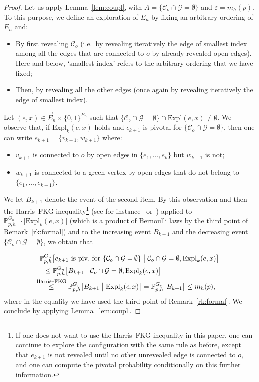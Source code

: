 \documentclass[10pt]{amsart}
\theoremstyle{definition}
\renewcommand{\pagebreak}[1][4]{}
\newcommand{\Pro}{\mathbb{P}}
\newcommand{\calC}{\mathcal{C}}
\newcommand{\calG}{\mathcal{G}}
\newcommand{\Expl}{\mathrm{Expl}}
\begin{document}
\begin{proof}
Let us apply Lemma~\ref{lem:coupl}, with $A=\{\calC_o\cap\calG=\emptyset\}$ and $\varepsilon=m_h(p)$. To this purpose, we define an exploration of $E_n$ by fixing an arbitrary ordering of $E_n$ and:
\begin{itemize}
\item By first revealing $\calC_o$ (i.e.\ by revealing iteratively the edge of smallest index among all the edges that are connected to $o$ by already revealed open edges). Here and below, `smallest index' refers to the arbitrary ordering that we have fixed;
\item Then, by revealing all the other edges (once again by revealing iteratively the edge of smallest index).
\end{itemize}
Let $(e,x) \in \vec{E}_n\times\{0,1\}^{E_n}$ such that $\{\calC_o\cap\calG=\emptyset\}\cap\Expl(e,x)\neq\emptyset$. We observe that, if $\Expl_k(e,x)$ holds and $e_{k+1}$ is pivotal for $\{\calC_o \cap \calG = \emptyset\}$, then one can write $e_{k+1}=\{v_{k+1},w_{k+1}\}$ where:
\begin{itemize}
\item $v_{k+1}$ is connected to $o$ by open edges in $\{e_1,\dots,e_k\}$ but $w_{k+1}$ is not;
\item $w_{k+1}$ is connected to a green vertex by open edges that do not belong to $\{e_1,\dots,e_{k+1}\}$.
\end{itemize}
We let $B_{k+1}$ denote the event of the second item. By this observation and then the Harris--FKG inequality\footnote{If one does not want to use the Harris--FKG inequality in this paper, one can continue to explore the configuration with the same rule as before, except that $e_{k+1}$ is not revealed until no other unrevealed edge is connected to $o$, and one can compute the pivotal probability conditionally on this further information.} (see for instance~\cite[Theorem~2.4]{Gri99} or~\cite[Lemma~3]{BR06}) applied to $\Pro_{p,h}^{G_n} \big[\, \cdot \mid \Expl_k(e,x)\big]$ (which is a product of Bernoulli laws by the third point of Remark~\ref{rk:formal}) and to the increasing event $B_{k+1}$ and the decreasing event $\{\calC_o\cap\calG=\emptyset\}$, we obtain that
\pagebreak
\begin{multline*}
\Pro_{p,h}^{G_n} \big[e_{k+1}\text{ is piv.\ for } \{\calC_o \cap \calG = \emptyset\} \; \big| \; \calC_o \cap \calG = \emptyset, \Expl_k(e,x) \big]\\
\begin{aligned}
&\le \Pro_{p,h}^{G_n} \big[B_{k+1} \; \big| \; \calC_o \cap \calG = \emptyset, \Expl_k(e,x) \big]\\
&\mkern-23mu\overset{\text{Harris--FKG}}{\le} \Pro_{p,h}^{G_n} \big[B_{k+1} \; \big| \; \Expl_k(e,x) \big]= \Pro_{p,h}^{G_n} \big[B_{k+1} \big] \le m_h(p),
\end{aligned}
\end{multline*}
where in the equality we have used the third point of Remark~\ref{rk:formal}. We conclude by applying Lemma~\ref{lem:coupl}.
\end{proof}
\end{document}
